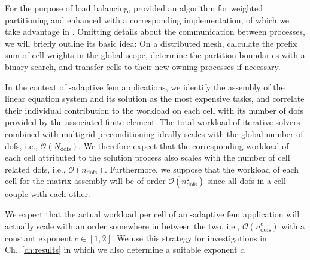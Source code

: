 
For the purpose of load balancing, \textcite[Sec.~3.3]{burstedde2011} provided an algorithm for weighted partitioning and enhanced \pforest{} \textcite{p4est22} with a corresponding implementation, of which we take advantage in \dealii{}. Omitting details about the communication between processes, we will briefly outline its basic idea: On a distributed mesh, calculate the prefix sum of cell weights in the global scope, determine the partition boundaries with a binary search, and transfer cells to their new owning processes if necessary.




In the context of \hp-adaptive \gls{fem} applications, we identify the assembly of the linear equation system and its solution as the most expensive tasks, and correlate their individual contribution to the workload on each cell with its number of \glspl{dof} provided by the associated finite element.
The total workload of iterative solvers combined with multigrid preconditioning ideally scales with the global number of \glspl{dof}, i.e., $\mathcal{O}\left(N_\text{dofs}\right)$. We therefore expect that the corresponding workload of each cell attributed to the solution process also scales with the number of cell related \glspl{dof}, i.e., $\mathcal{O}\left(n_\text{dofs}\right)$. Furthermore, we suppose that the workload of each cell for the matrix assembly will be of order $\mathcal{O}\left(n_\text{dofs}^2\right)$ since all \glspl{dof} in a cell couple with each other.

We expect that the actual workload per cell of an \hp-adaptive \gls{fem} application will actually scale with an order somewhere in between the two, i.e., $\mathcal{O}\left(n_\text{dofs}^c\right)$ with a constant exponent $c \in [1,2]$. We use this strategy for investigations in Ch.~\ref{ch:results} in which we also determine a suitable exponent $c$.

